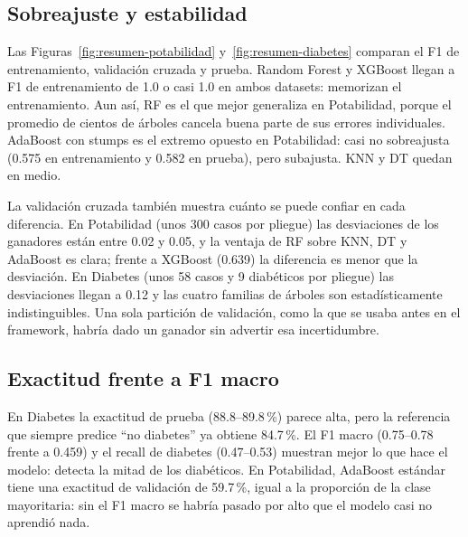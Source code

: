 \subsection{Sobreajuste y estabilidad}
Las Figuras~\ref{fig:resumen-potabilidad} y~\ref{fig:resumen-diabetes} comparan el F1 de
entrenamiento, validación cruzada y prueba. Random Forest y XGBoost llegan a F1 de
entrenamiento de 1.0 o casi 1.0 en ambos datasets: memorizan el entrenamiento. Aun así,
RF es el que mejor generaliza en Potabilidad, porque el promedio de cientos de árboles
cancela buena parte de sus errores individuales. AdaBoost con stumps es el extremo
opuesto en Potabilidad: casi no sobreajusta (0.575 en entrenamiento y 0.582 en prueba),
pero subajusta. KNN y DT quedan en medio.

La validación cruzada también muestra cuánto se puede confiar en cada diferencia. En
Potabilidad (unos 300 casos por pliegue) las desviaciones de los ganadores están entre
0.02 y 0.05, y la ventaja de RF sobre KNN, DT y AdaBoost es clara; frente a XGBoost
(0.639) la diferencia es menor que la desviación. En Diabetes (unos 58 casos y 9
diabéticos por pliegue) las desviaciones llegan a 0.12 y las cuatro familias de árboles
son estadísticamente indistinguibles. Una sola partición de validación, como la que se
usaba antes en el framework, habría dado un ganador sin advertir esa incertidumbre.

\subsection{Exactitud frente a F1 macro}
En Diabetes la exactitud de prueba (88.8--89.8\,\%) parece alta, pero la referencia que
siempre predice ``no diabetes'' ya obtiene 84.7\,\%. El F1 macro (0.75--0.78 frente a
0.459) y el recall de diabetes (0.47--0.53) muestran mejor lo que hace el modelo: detecta
la mitad de los diabéticos. En Potabilidad, AdaBoost estándar tiene una exactitud de
validación de 59.7\,\%, igual a la proporción de la clase mayoritaria: sin el F1 macro
se habría pasado por alto que el modelo casi no aprendió nada.

